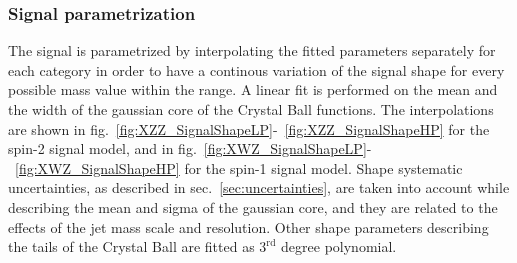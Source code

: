 


\subsubsection{Signal parametrization}
\label{ssec:signal_parametrization}

The signal is parametrized by interpolating the fitted parameters separately for each category in order to have a continous variation of the signal shape for every possible mass value within the range. A linear fit is performed on the mean and the width of the gaussian core of the Crystal Ball functions. The interpolations are shown in fig.~\ref{fig:XZZ_SignalShapeLP}-~\ref{fig:XZZ_SignalShapeHP} for the spin-2 signal model, and in fig.~\ref{fig:XWZ_SignalShapeLP}-~\ref{fig:XWZ_SignalShapeHP} for the spin-1 signal model. Shape systematic uncertainties, as described in sec.~\ref{sec:uncertainties}, are taken into account while describing the mean and sigma of the gaussian core, and they are related to the effects of the jet mass scale and resolution. Other shape parameters describing the tails of the Crystal Ball are fitted as $3^{\text{rd}}$ degree polynomial.


